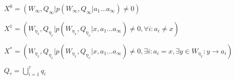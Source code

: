 \documentclass[sigconf]{acmart}
\theoremstyle{remark}
\begin{document}
$X^0=(W_\infty,Q_\infty|p(W_\infty,Q_\infty|a_1...a_\infty)\neq{0})$

$X^1=(W_{\eta_{x}},Q_{\eta_{x}}|p(W_{\eta_{x}},Q_{\eta_{x}}|x,a_1...a_\infty)\neq{0},\forall{i}:{a_i}\neq{x})$

$X^{*}=(W_{\eta_{x}},Q_{\eta_{x}}|p(W_{\eta_{x}},Q_{\eta_{x}}|x,a_1...a_\infty)\neq{0},\exists{i}:{a_i={x}},\exists{y\in{W_{\eta_{x}}}}:y\to{a_i})$

$Q_\tau=\bigcup\limits_{i=1}^{\tau}{q_i}$




\end{document}
